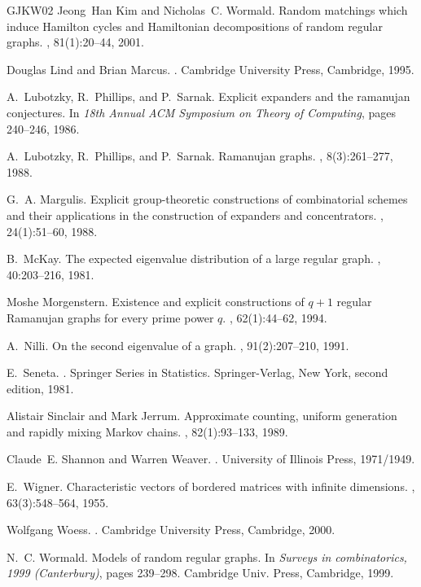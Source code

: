 \documentclass[12pt]{article}
\begin{document}
\begin{thebibliography}{GJKW02}
Jeong~Han Kim and Nicholas~C. Wormald.
\newblock Random matchings which induce {H}amilton cycles and {H}amiltonian
  decompositions of random regular graphs.
, 81(1):20--44, 2001.

Douglas Lind and Brian Marcus.
.
\newblock Cambridge University Press, Cambridge, 1995.

A.~Lubotzky, R.~Phillips, and P.~Sarnak.
\newblock Explicit expanders and the ramanujan conjectures.
\newblock In {\em 18th Annual ACM Symposium on Theory of Computing}, pages
  240--246, 1986.

A.~Lubotzky, R.~Phillips, and P.~Sarnak.
\newblock Ramanujan graphs.
, 8(3):261--277, 1988.

G.~A. Margulis.
\newblock Explicit group-theoretic constructions of combinatorial schemes and
  their applications in the construction of expanders and concentrators.
, 24(1):51--60, 1988.

B.~McKay.
\newblock The expected eigenvalue distribution of a large regular graph.
, 40:203--216, 1981.

Moshe Morgenstern.
\newblock Existence and explicit constructions of $q+1$ regular {R}amanujan
  graphs for every prime power $q$.
, 62(1):44--62, 1994.

A.~Nilli.
\newblock On the second eigenvalue of a graph.
, 91(2):207--210, 1991.

E.~Seneta.
.
\newblock Springer Series in Statistics. Springer-Verlag, New York, second
  edition, 1981.

Alistair Sinclair and Mark Jerrum.
\newblock Approximate counting, uniform generation and rapidly mixing {M}arkov
  chains.
, 82(1):93--133, 1989.

Claude~E. Shannon and Warren Weaver.
.
\newblock University of Illinois Press, 1971/1949.

E.~Wigner.
\newblock Characteristic vectors of bordered matrices with infinite dimensions.
, 63(3):548--564, 1955.

Wolfgang Woess.
.
\newblock Cambridge University Press, Cambridge, 2000.

N.~C. Wormald.
\newblock Models of random regular graphs.
\newblock In {\em Surveys in combinatorics, 1999 (Canterbury)}, pages 239--298.
  Cambridge Univ. Press, Cambridge, 1999.

\end{thebibliography}
\end{document}
